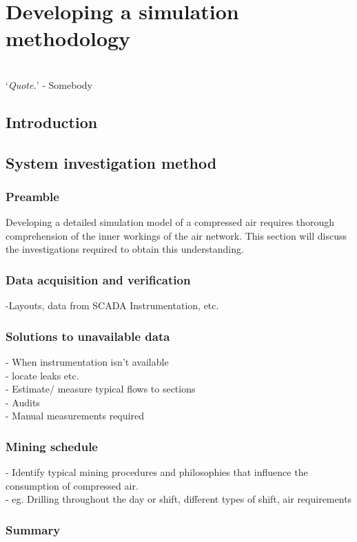 \chapter{Developing a simulation methodology}
\thispagestyle{empty}
\vspace{38em}
\hrulefill
\\
\enquote*{\textit{Quote.}} - Somebody\\
\newpage
\section{Introduction}
\section{System investigation method}
	\subsection{Preamble}
		Developing a detailed simulation model of a compressed air requires thorough comprehension of the inner workings of the air network. This section will discuss the investigations required to obtain this understanding.
	\subsection{Data acquisition and verification} %
		-Layouts, data from SCADA Instrumentation, etc.
	\subsection{Solutions to unavailable data}
		- When instrumentation isn't available\\
		- locate leaks etc.\\
		- Estimate/ measure typical flows to sections\\
		- Audits\\
		- Manual measurements required
	\subsection{Mining schedule}
		- Identify typical mining procedures and philosophies that influence the consumption of compressed air.\\
		- eg. Drilling throughout the day or shift, different types of shift, air requirements
	\subsection{Summary}
